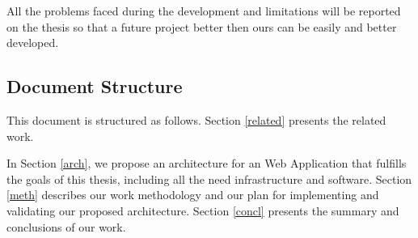	All the problems faced during the development and limitations will be reported on the thesis so that a future project better then ours can be easily and better developed.

\subsection{Document Structure} %
This document is structured as follows. Section \ref{related} presents the related work.

        
	In Section \ref{arch}, we propose an architecture for an Web Application that fulfills the goals of this thesis, including all the need infrastructure and software.
	Section \ref{meth} describes our work methodology and our plan for implementing and validating our proposed architecture.
	Section \ref{concl} presents the summary and conclusions of our work.

